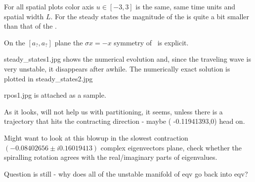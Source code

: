 % 

For all spatial plots color axis $u \in [-3, 3]$ is the same,
same time units and spatial width $L$.
For the steady states the magnitude of the  is quite 
a bit smaller than that of the .

On the 
	$[a_?,a_?]$ plane
	the $\sigma x = -x$ symmetry of \KSe\ is explicit.


steady\_states1.jpg shows the numerical evolution and, since the
traveling wave is very unstable, it disappears after awhile. 
The numerically exact solution is plotted in steady\_states2.jpg

rpos1.jpg is attached as a sample. 

As it looks, will not help us with partitioning, it seems, unless there is
a trajectory that hits the contracting direction - maybe
( -0.11941393,0)
head on.

Might want to look at this blowup in
the  slowest contraction
$   ( -0.08402656 \pm i 0.16019413)$
complex eigenvectors plane, check whether the
spiralling rotation agrees with the real/imaginary parts of eigenvalues.

Question is still - why does all of the unstable manifold of 
 eqv go back
into 
 eqv?

